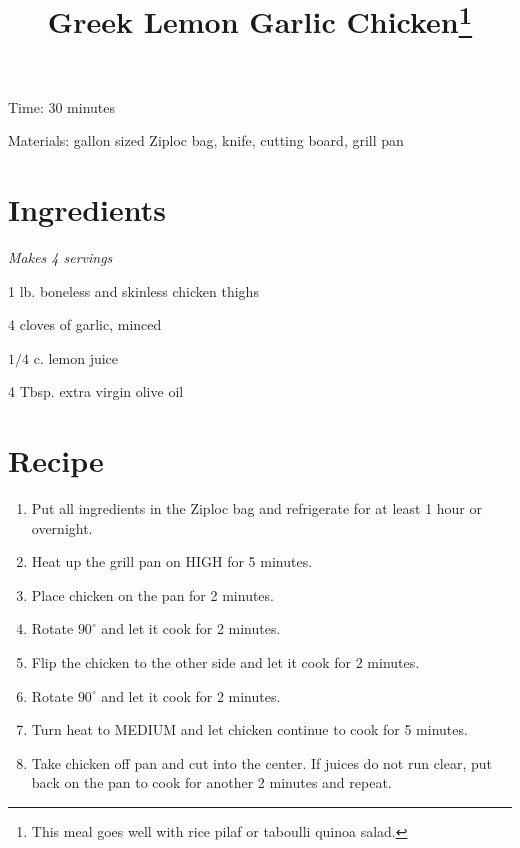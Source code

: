 \documentclass{article}
\title{Greek Lemon Garlic Chicken\footnote{This meal goes well with rice pilaf or taboulli quinoa salad.}}
\begin{document}
Time: 30 minutes

Materials: gallon sized Ziploc bag, knife, cutting board, grill pan

\section{Ingredients}
\textit{Makes 4 servings}

1 lb. boneless and skinless chicken thighs

4 cloves of garlic, minced

$1/4$ c. lemon juice

4 Tbsp. extra virgin olive oil

\section{Recipe}
\begin{enumerate}
\item{Put all ingredients in the Ziploc bag and refrigerate for at least 1 hour or overnight.}
\item{Heat up the grill pan on HIGH for 5 minutes.}
\item{Place chicken on the pan for 2 minutes.}
\item{Rotate $90^{\circ}$ and let it cook for 2 minutes.}
\item{Flip the chicken to the other side and let it cook for 2 minutes.}
\item{Rotate $90^{\circ}$ and let it cook for 2 minutes.}
\item{Turn heat to MEDIUM and let chicken continue to cook for 5 minutes.}
\item{Take chicken off pan and cut into the center. If juices do not run clear, put back on the pan to cook for another 2 minutes and repeat.}
\end{enumerate}
\end{document}
